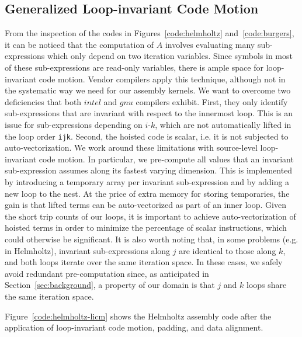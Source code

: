 \documentclass[conference]{IEEEtran}
\begin{document}
\subsection{Generalized Loop-invariant Code Motion}
\label{sec:code-transf-licm}
From the inspection of the codes in Figures~\ref{code:helmholtz} and~\ref{code:burgers}, it can be noticed that the computation of $A$ involves evaluating many sub-expressions which only depend on two iteration variables. Since symbols in most of these sub-expressions are read-only variables, there is ample space for loop-invariant code motion. Vendor compilers apply this technique, although not in the systematic way we need for our assembly kernels. We want to overcome two deficiencies that both $intel$ and $gnu$ compilers exhibit. First, they only identify sub-expressions that are invariant with respect to the innermost loop. This is an issue for sub-expressions depending on $i$-$k$, which are not automatically lifted in the loop order \texttt{ijk}. Second, the hoisted code is scalar, i.e. it is not subjected to auto-vectorization. We work around these limitations with source-level loop-invariant code motion. In particular, we pre-compute all values that an invariant sub-expression assumes along its fastest varying dimension. This is implemented by introducing a temporary array per invariant sub-expression and by adding a new loop to the nest. At the price of extra memory for storing temporaries, the gain is that lifted terms can be auto-vectorized as part of an inner loop. Given the short trip counts of our loops, it is important to achieve auto-vectorization of hoisted terms in order to minimize the percentage of scalar instructions, which could otherwise be significant. It is also worth noting that, in some problems (e.g. in Helmholtz), invariant sub-expressions along $j$ are identical to those along $k$, and both loops iterate over the same iteration space. In these cases, we safely avoid redundant pre-computation since, as anticipated in Section~\ref{sec:background}, a property of our domain is that $j$ and $k$ loops share the same iteration space. 

Figure~\ref{code:helmholtz-licm} shows the Helmholtz assembly code after the application of loop-invariant code motion, padding, and data alignment.
\end{document}
